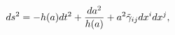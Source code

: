 \begin{equation}
ds^2 = - h(a) dt^2 + {da^2\over{h(a)}} + a^2 \tilde\gamma_{ij} dx^i dx^j,
\label{bulkmet}
\end{equation}

